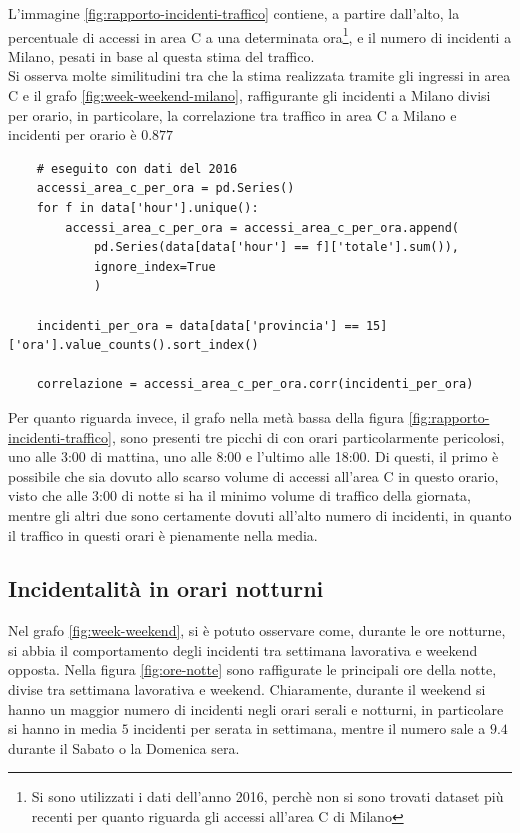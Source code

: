 \documentclass[a4paper]{report}
\begin{document}
L'immagine \ref{fig:rapporto-incidenti-traffico} contiene, a partire dall'alto, 
la percentuale di accessi in area C a una determinata 
ora\footnote{Si sono utilizzati i dati dell'anno 2016, perchè non si sono trovati dataset più recenti per 
quanto riguarda gli accessi all'area C di Milano}, 
e il numero di incidenti a Milano, pesati in base al questa stima del traffico.\\
Si osserva molte similitudini tra che la stima realizzata tramite gli ingressi in area C e 
il grafo \ref{fig:week-weekend-milano}, raffigurante gli incidenti a Milano divisi per orario, 
in particolare, la correlazione tra traffico in area C a Milano e incidenti per orario è $0.877$

\begin{lstlisting}
    # eseguito con dati del 2016
    accessi_area_c_per_ora = pd.Series()
    for f in data['hour'].unique():
        accessi_area_c_per_ora = accessi_area_c_per_ora.append(
            pd.Series(data[data['hour'] == f]['totale'].sum()), 
            ignore_index=True
            )

    incidenti_per_ora = data[data['provincia'] == 15]['ora'].value_counts().sort_index()

    correlazione = accessi_area_c_per_ora.corr(incidenti_per_ora)
\end{lstlisting}

Per quanto riguarda invece, il grafo nella metà bassa della figura \ref{fig:rapporto-incidenti-traffico}, 
sono presenti tre picchi di con orari particolarmente pericolosi, uno alle 3:00 di mattina, uno alle 
8:00 e l'ultimo alle 18:00. 
Di questi, il primo è possibile che sia dovuto allo scarso volume di accessi all'area C in questo orario, 
visto che alle 3:00 di notte si ha il minimo volume di traffico della giornata, 
mentre gli altri due sono certamente dovuti all'alto numero di incidenti, in quanto il traffico in questi 
orari è pienamente nella media.

\subsection{Incidentalità in orari notturni}

Nel grafo \ref{fig:week-weekend}, si è potuto osservare come, durante le 
ore notturne, si abbia il comportamento degli incidenti tra settimana lavorativa e weekend opposta.
Nella figura \ref{fig:ore-notte} sono raffigurate le principali ore della notte, divise tra 
settimana lavorativa e weekend.
Chiaramente, durante il weekend si hanno un maggior numero di incidenti negli orari serali e 
notturni, in particolare si hanno in media $5$ incidenti per serata in settimana, mentre il numero 
sale a $9.4$ durante il Sabato o la Domenica sera.
\end{document}
